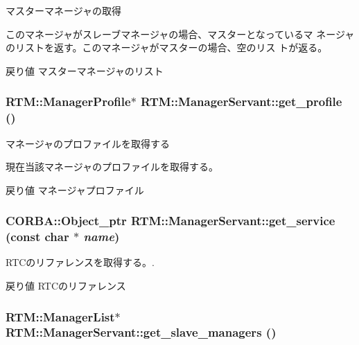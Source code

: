 マスターマネージャの取得 

このマネージャがスレーブマネージャの場合、マスターとなっているマ ネージャのリストを返す。このマネージャがマスターの場合、空のリス トが返る。

\begin{DoxyReturn}{戻り値}
マスターマネージャのリスト 
\end{DoxyReturn}
\subsubsection[{get\_\-profile}]{\setlength{\rightskip}{0pt plus 5cm}RTM::ManagerProfile$\ast$ RTM::ManagerServant::get\_\-profile ()}\label{classRTM_1_1ManagerServant_ac6f6020bcb7291afdba9c4104c5a25fb}


マネージャのプロファイルを取得する 

現在当該マネージャのプロファイルを取得する。

\begin{DoxyReturn}{戻り値}
マネージャプロファイル 
\end{DoxyReturn}
\subsubsection[{get\_\-service}]{\setlength{\rightskip}{0pt plus 5cm}CORBA::Object\_\-ptr RTM::ManagerServant::get\_\-service (const char $\ast$ {\em name})}\label{classRTM_1_1ManagerServant_a0b0f618d18c13dc8a7a31bae56027f84}


RTCのリファレンスを取得する。. 

\begin{DoxyReturn}{戻り値}
RTCのリファレンス 
\end{DoxyReturn}
\subsubsection[{get\_\-slave\_\-managers}]{\setlength{\rightskip}{0pt plus 5cm}RTM::ManagerList$\ast$ RTM::ManagerServant::get\_\-slave\_\-managers ()}\label{classRTM_1_1ManagerServant_ae4ccbc651be158f1ce221128bef598fd}


